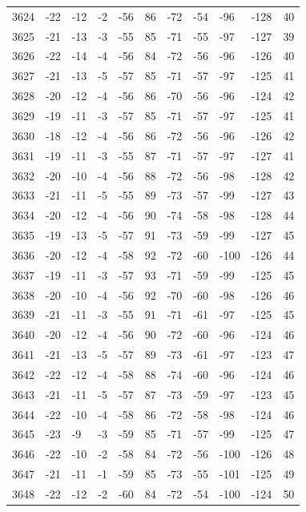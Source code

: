 \begin{table}[H]
\begin{tabular}{lllllllllll}
3624 & -22 & -12 & -2 & -56 & 86 & -72 & -54 & -96 & -128 & 40 \\
3625 & -21 & -13 & -3 & -55 & 85 & -71 & -55 & -97 & -127 & 39 \\
3626 & -22 & -14 & -4 & -56 & 84 & -72 & -56 & -96 & -126 & 40 \\
3627 & -21 & -13 & -5 & -57 & 85 & -71 & -57 & -97 & -125 & 41 \\
3628 & -20 & -12 & -4 & -56 & 86 & -70 & -56 & -96 & -124 & 42 \\
3629 & -19 & -11 & -3 & -57 & 85 & -71 & -57 & -97 & -125 & 41 \\
3630 & -18 & -12 & -4 & -56 & 86 & -72 & -56 & -96 & -126 & 42 \\
3631 & -19 & -11 & -3 & -55 & 87 & -71 & -57 & -97 & -127 & 41 \\
3632 & -20 & -10 & -4 & -56 & 88 & -72 & -56 & -98 & -128 & 42 \\
3633 & -21 & -11 & -5 & -55 & 89 & -73 & -57 & -99 & -127 & 43 \\
3634 & -20 & -12 & -4 & -56 & 90 & -74 & -58 & -98 & -128 & 44 \\
3635 & -19 & -13 & -5 & -57 & 91 & -73 & -59 & -99 & -127 & 45 \\
3636 & -20 & -12 & -4 & -58 & 92 & -72 & -60 & -100 & -126 & 44 \\
3637 & -19 & -11 & -3 & -57 & 93 & -71 & -59 & -99 & -125 & 45 \\
3638 & -20 & -10 & -4 & -56 & 92 & -70 & -60 & -98 & -126 & 46 \\
3639 & -21 & -11 & -3 & -55 & 91 & -71 & -61 & -97 & -125 & 45 \\
3640 & -20 & -12 & -4 & -56 & 90 & -72 & -60 & -96 & -124 & 46 \\
3641 & -21 & -13 & -5 & -57 & 89 & -73 & -61 & -97 & -123 & 47 \\
3642 & -22 & -12 & -4 & -58 & 88 & -74 & -60 & -96 & -124 & 46 \\
3643 & -21 & -11 & -5 & -57 & 87 & -73 & -59 & -97 & -123 & 45 \\
3644 & -22 & -10 & -4 & -58 & 86 & -72 & -58 & -98 & -124 & 46 \\
3645 & -23 & -9 & -3 & -59 & 85 & -71 & -57 & -99 & -125 & 47 \\
3646 & -22 & -10 & -2 & -58 & 84 & -72 & -56 & -100 & -126 & 48 \\
3647 & -21 & -11 & -1 & -59 & 85 & -73 & -55 & -101 & -125 & 49 \\
3648 & -22 & -12 & -2 & -60 & 84 & -72 & -54 & -100 & -124 & 50 \\

\end{tabular}
\end{table}
